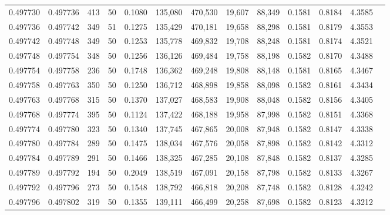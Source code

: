 \begin{tabular}{rrrrrrrrrrrrr}
0.497730 & 0.497736 & 413 &  50 &                                     0.1080 & 135,080 & 470,530 &  19,607 &  88,349 & 0.1581 & 0.8184 & 4.3585 \\
0.497736 & 0.497742 & 349 &  51 &                                     0.1275 & 135,429 & 470,181 &  19,658 &  88,298 & 0.1581 & 0.8179 & 4.3553 \\
0.497742 & 0.497748 & 349 &  50 &                                     0.1253 & 135,778 & 469,832 &  19,708 &  88,248 & 0.1581 & 0.8174 & 4.3521 \\
0.497748 & 0.497754 & 348 &  50 &                                     0.1256 & 136,126 & 469,484 &  19,758 &  88,198 & 0.1582 & 0.8170 & 4.3488 \\
0.497754 & 0.497758 & 236 &  50 &                                     0.1748 & 136,362 & 469,248 &  19,808 &  88,148 & 0.1581 & 0.8165 & 4.3467 \\
0.497758 & 0.497763 & 350 &  50 &                                     0.1250 & 136,712 & 468,898 &  19,858 &  88,098 & 0.1582 & 0.8161 & 4.3434 \\
0.497763 & 0.497768 & 315 &  50 &                                     0.1370 & 137,027 & 468,583 &  19,908 &  88,048 & 0.1582 & 0.8156 & 4.3405 \\
0.497768 & 0.497774 & 395 &  50 &                                     0.1124 & 137,422 & 468,188 &  19,958 &  87,998 & 0.1582 & 0.8151 & 4.3368 \\
0.497774 & 0.497780 & 323 &  50 &                                     0.1340 & 137,745 & 467,865 &  20,008 &  87,948 & 0.1582 & 0.8147 & 4.3338 \\
0.497780 & 0.497784 & 289 &  50 &                                     0.1475 & 138,034 & 467,576 &  20,058 &  87,898 & 0.1582 & 0.8142 & 4.3312 \\
0.497784 & 0.497789 & 291 &  50 &                                     0.1466 & 138,325 & 467,285 &  20,108 &  87,848 & 0.1582 & 0.8137 & 4.3285 \\
0.497789 & 0.497792 & 194 &  50 &                                     0.2049 & 138,519 & 467,091 &  20,158 &  87,798 & 0.1582 & 0.8133 & 4.3267 \\
0.497792 & 0.497796 & 273 &  50 &                                     0.1548 & 138,792 & 466,818 &  20,208 &  87,748 & 0.1582 & 0.8128 & 4.3242 \\
0.497796 & 0.497802 & 319 &  50 &                                     0.1355 & 139,111 & 466,499 &  20,258 &  87,698 & 0.1582 & 0.8123 & 4.3212 \\

\end{tabular}
